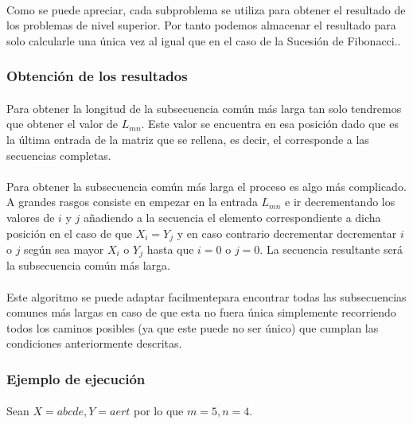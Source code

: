 \documentclass{article}
\begin{document}
		\paragraph{}
		Como se puede apreciar, cada subproblema se utiliza para obtener el resultado de los problemas de nivel superior. Por tanto podemos almacenar el resultado para solo calcularle una única vez al igual que en el caso de la Sucesión de Fibonacci..
			
	\subsubsection{Obtención de los resultados}
		\paragraph{}
		Para obtener la longitud de la subsecuencia común más larga tan solo tendremos que obtener el valor de $L_{mn}$. Este valor se encuentra en esa posición dado que es la última entrada de la matriz que se rellena, es decir, el corresponde a las secuencias completas.

		\paragraph{}
		Para obtener la subsecuencia común más larga el proceso es algo más complicado. A grandes rasgos consiste en empezar en la entrada $L_{mn}$ e ir decrementando los valores de $i$ y $j$ añadiendo a la secuencia el elemento correspondiente a dicha posición en el caso de que $ X_{i} = Y_{j}$ y en caso contrario decrementar decrementar $i$ o $j$ según sea mayor $X_{i}$ o  $Y_{j}$ hasta que $i = 0$ o $j = 0$. La secuencia resultante será la subsecuencia común más larga. 
		\paragraph{}
		Este algoritmo se puede adaptar facilmentepara encontrar todas las subsecuencias comunes más largas en caso de que esta no fuera única simplemente recorriendo todos los caminos posibles (ya que este puede no ser único) que cumplan las condiciones anteriormente descritas.

	\subsubsection{Ejemplo de ejecución}
		\paragraph{}
		Sean $X = abcde, Y = aert $ por lo que $m = 5, n = 4$.
\end{document}

